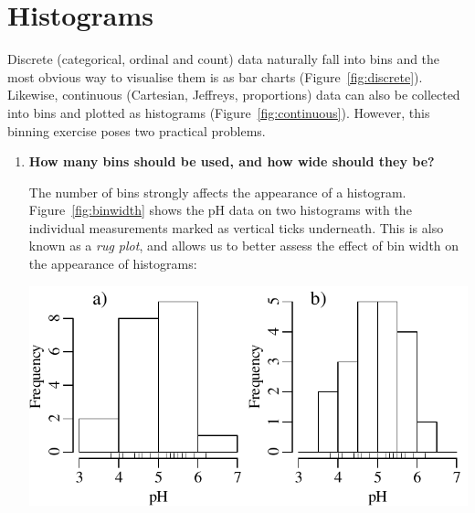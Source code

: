 \section{Histograms}\label{sec:histogram}

Discrete (categorical, ordinal and count) data naturally fall into
bins and the most obvious way to visualise them is as bar charts
(Figure~\ref{fig:discrete}).  Likewise, continuous (Cartesian,
Jeffreys, proportions) data can also be collected into bins and
plotted as histograms (Figure~\ref{fig:continuous}). However, this
binning exercise poses two practical problems.

\begin{enumerate}

\item\textbf{How many bins should be used, and how wide should they be?}

  The number of bins strongly affects the appearance of a histogram.
  Figure~\ref{fig:binwidth} shows the pH data on two histograms with
  the individual measurements marked as vertical ticks
  underneath. This is also known as a \emph{rug plot}, and allows us
  to better assess the effect of bin width on the appearance of
  histograms:
  
  \noindent\begin{minipage}[t][][b]{.55\linewidth}
  \includegraphics[width=\textwidth]{../figures/binwidth.pdf}\medskip
  \end{minipage}
  \begin{minipage}[t][][t]{.45\linewidth}
    \label{fig:binwidth}
  \end{minipage}


\end{enumerate}
